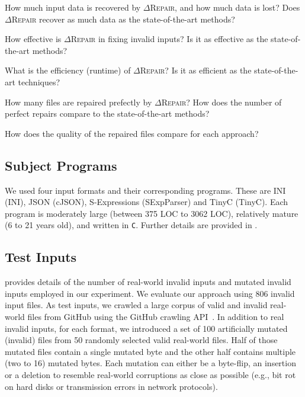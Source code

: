 \documentclass[acmsmall,screen,review,anonymous]{acmart}
\newcommand{\approach}{\textsc{$\Delta$Repair}\xspace}
\def\<#1>{\texttt{#1}}
\begin{document}
\begin{description}[labelwidth=!, labelindent=15pt]

\item[RQ1: Data Recovery and Data Loss.]
How much input data is recovered by \approach, and how much data is lost? %
Does \approach recover as much data as 
the state-of-the-art methods?

  \item[RQ2: Effectiveness.]  %
How effective is \approach in fixing invalid inputs? Is it as effective as the state-of-the-art methods?

\item[RQ3: Efficiency.] What is the efficiency (runtime) of
\approach? Is it as efficient as the state-of-the-art techniques?

\item[RQ4: Perfect Repair.] How many files are repaired prefectly by
\approach? How does the number of perfect repairs compare to the state-of-the-art methods?

\item[RQ5: Quality of Repairs.] How does the quality of the repaired files compare for each approach?
\end{description}


\subsection{Subject Programs} %
We used four input formats and their corresponding programs. These are INI (INI), JSON (cJSON), S-Expressions (SExpParser) and TinyC (TinyC). Each program is moderately large (between 375 LOC to 3062 LOC), relatively mature (6 to 21 years old), and written in \<C>. Further details are provided in .

\subsection{Test Inputs} 
 provides details of the number of
real-world invalid inputs and mutated invalid inputs employed in our experiment.
We evaluate our approach using 806 invalid input files. %
As test inputs, we crawled a large corpus of valid and invalid real-world files
from GitHub using the GitHub crawling API~\cite{githubapi}. 
In addition to real invalid inputs, for each format, we introduced a set of 100 artificially mutated (invalid) files
from 50 randomly selected valid real-world files.
Half of those mutated files contain a single mutated byte and the other half
contains multiple (two to 16) mutated bytes.
Each mutation can either be a byte-flip, an insertion or a deletion to 
resemble real-world corruptions as close as possible
(e.g., bit rot on hard disks or transmission errors in network protocols).
\end{document}
